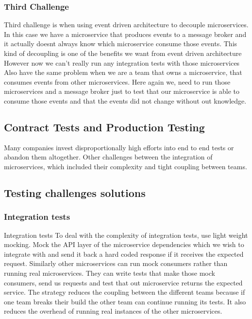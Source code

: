 \documentclass[a4paper, 11pt]{book}
\begin{document}
    \subsubsection{Third Challenge}
    Third challenge is when using event driven architecture to decouple microservices.
    In this case we have a microservice that produces events to a message broker and it actually doesnt always know which microservice consume those events.
    This kind of decoupling is one of the benefits we want from event driven architecture
    However now we can't really run any integration tests with those microservices
    Also have the same problem when we are a team that owns a microservice, that consumes events from other microservices.
    Here again we, need to run those microservices and a message broker just to test that our microservice is able to consume those events and that the events did not change without out knowledge.

    \subsection{Contract Tests and Production Testing}
    Many companies invest disproportionally high efforts into end to end tests or abandon them altogether.
    Other challenges between the integration of microservices, which included their complexity and tight coupling between teams.

    \subsection{Testing challenges solutions}

    \subsubsection{Integration tests}
    Integration tests
    To deal with the complexity of integration tests, use light weight mocking.
    Mock the API layer of the microservice dependencies which we wish to integrate with and send it back a hard coded response if it receives the expected request.
    Similarly other microservices can run mock consumers rather than running real microservices.
    They can write tests that make those mock consumers, send us requests and test that out microservice returns the expected service.
    The strategy reduces the coupling between the different teams because if one team breaks their build the other team can continue running its tests.
    It also reduces the overhead of running real instances of the other microservices.
\end{document}
